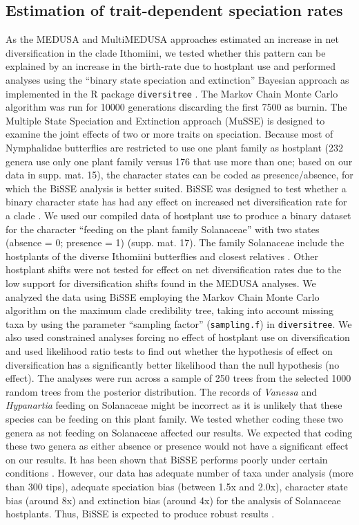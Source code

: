 \documentclass[10pt]{article}
\begin{document}
\subsection*{Estimation of trait-dependent speciation
rates}

As the MEDUSA and MultiMEDUSA approaches estimated an increase in net
diversification in the clade Ithomiini, we tested whether this pattern
can be explained by an increase in the birth-rate due to hostplant use
and performed analyses using the ``binary state speciation and
extinction'' \cite{maddison2007} Bayesian approach as implemented in the R package
\texttt{diversitree} \cite{fitzjohn2012}. The Markov Chain Monte Carlo algorithm
was run for 10000 generations discarding the first 7500 as burnin. The
Multiple State Speciation and Extinction approach (MuSSE) 
\cite{fitzjohn2012} is
designed to examine the joint effects of two or more traits on
speciation. Because most of Nymphalidae butterflies are restricted to
use one plant family as hostplant (232 genera use only one plant family
versus 176 that use more than one; based on our data in supp. mat. 15),
the character states can be coded as presence/absence, for which the
BiSSE analysis is better suited. BiSSE was designed to test whether a
binary character state has had any effect on increased net
diversification rate for a clade \cite{maddison2007}. We used our compiled data of
hostplant use to produce a binary dataset for the character ``feeding on
the plant family Solanaceae'' with two states (absence = 0; presence =
1) (supp. mat. 17). The family Solanaceae include the hostplants of the
diverse Ithomiini butterflies and closest relatives \cite{willmott2006}. Other
hostplant shifts were not tested for effect on net diversification rates
due to the low support for diversification shifts found in the MEDUSA
analyses. We analyzed the data using BiSSE employing the Markov Chain
Monte Carlo algorithm on the maximum clade credibility tree, taking into
account missing taxa by using the parameter ``sampling factor''
(\texttt{sampling.f}) in \texttt{diversitree}. We also used constrained
analyses forcing no effect of hostplant use on diversification and used
likelihood ratio tests to find out whether the hypothesis of effect on
diversification has a significantly better likelihood than the null
hypothesis (no effect). The analyses were run across a sample of 250
trees from the selected 1000 random trees from the posterior
distribution. The records of \emph{Vanessa} and \emph{Hypanartia}
feeding on Solanaceae \cite{beccaloni2008,scott1986} might be incorrect as it
is unlikely
that these species can be feeding on this plant family. We tested
whether coding these two genera as not feeding on Solanaceae affected
our results. We expected that coding these two genera as either absence
or presence would not have a significant effect on our results. It has
been shown that BiSSE performs poorly under certain conditions 
\cite{davis2013}.
However, our data has adequate number of taxa under analysis (more than
300 tips), adequate speciation bias (between 1.5x and 2.0x), character
state bias (around 8x) and extinction bias (around 4x) for the analysis
of Solanaceae hostplants. Thus, BiSSE is expected to produce robust
results \cite{davis2013}.
\end{document}
